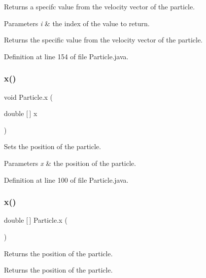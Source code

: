 Returns a specifc value from the velocity vector of the particle. 
\begin{DoxyParams}{Parameters}
{\em i} & the index of the value to return. \\
\hline
\end{DoxyParams}
\begin{DoxyReturn}{Returns}
the specific value from the velocity vector of the particle. 
\end{DoxyReturn}


Definition at line 154 of file Particle.\+java.

\mbox{\label{class_particle_a421fd391e44a79cc2a32cfe635ab9df3}} 
\subsubsection{\texorpdfstring{x()}{x()}\hspace{0.1cm}{\footnotesize\ttfamily [1/3]}}
{\footnotesize\ttfamily void Particle.\+x (\begin{DoxyParamCaption}\item[{double \mbox{[}$\,$\mbox{]}}]{x }\end{DoxyParamCaption})}

Sets the position of the particle. 
\begin{DoxyParams}{Parameters}
{\em x} & the position of the particle. \\
\hline
\end{DoxyParams}


Definition at line 100 of file Particle.\+java.

\mbox{\label{class_particle_a4ae274d487a3565fa11d59206c45139d}} 
\subsubsection{\texorpdfstring{x()}{x()}\hspace{0.1cm}{\footnotesize\ttfamily [2/3]}}
{\footnotesize\ttfamily double \mbox{[}$\,$\mbox{]} Particle.\+x (\begin{DoxyParamCaption}{ }\end{DoxyParamCaption})}

Returns the position of the particle. \begin{DoxyReturn}{Returns}
the position of the particle. 
\end{DoxyReturn}


